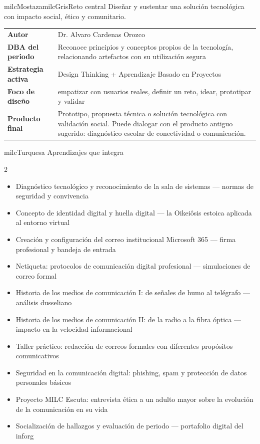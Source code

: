 \documentclass[11pt,letterpaper]{article}
\begin{document}
\begin{softbox}{milcMostaza}{milcGris}{Reto central}
Diseñar y sustentar una solución tecnológica con impacto social, ético y comunitario.
\end{softbox}

\begin{tabularx}{\textwidth}{>{\bfseries}p{3.4cm}X}
\rowcolor{milcMagenta!12}Autor & Dr. Alvaro Cardenas Orozco\\
DBA del periodo & Reconoce principios y conceptos propios de la tecnología, relacionando artefactos con su utilización segura\\
Estrategia activa & Design Thinking + Aprendizaje Basado en Proyectos\\
Foco de diseño & empatizar con usuarios reales, definir un reto, idear, prototipar y validar\\
Producto final & Prototipo, propuesta técnica o solución tecnológica con validación social. Puede dialogar con el producto antiguo sugerido: diagnóstico escolar de conectividad o comunicación.\\
\end{tabularx}

\begin{titlebox}{milcTurquesa}
Aprendizajes que integra
\end{titlebox}
\begin{multicols}{2}
\begin{itemize}[leftmargin=*]
\item Diagnóstico tecnológico y reconocimiento de la sala de sistemas — normas de seguridad y convivencia
\item Concepto de identidad digital y huella digital — la Oikeiôsis estoica aplicada al entorno virtual
\item Creación y configuración del correo institucional Microsoft 365 — firma profesional y bandeja de entrada
\item Netiqueta: protocolos de comunicación digital profesional — simulaciones de correo formal
\item Historia de los medios de comunicación I: de señales de humo al telégrafo — análisis dusseliano
\item Historia de los medios de comunicación II: de la radio a la fibra óptica — impacto en la velocidad informacional
\item Taller práctico: redacción de correos formales con diferentes propósitos comunicativos
\item Seguridad en la comunicación digital: phishing, spam y protección de datos personales básicos
\item Proyecto MILC Escuta: entrevista ética a un adulto mayor sobre la evolución de la comunicación en su vida
\item Socialización de hallazgos y evaluación de periodo — portafolio digital del inforg
\end{itemize}
\end{multicols}
\end{document}
